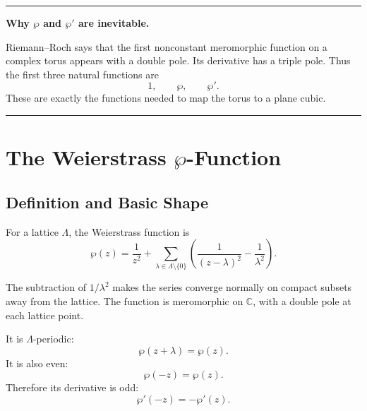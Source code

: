 \documentclass[11pt]{article}
\newcommand{\C}{\mathbb{C}}
\newenvironment{keyidea}[1]{%
  \par\medskip
  \begin{center}
  \begin{minipage}{0.92\textwidth}
  \hrule
  \smallskip
  \textbf{#1.}\quad\ignorespaces
}{%
  \smallskip
  \hrule
  \end{minipage}
  \end{center}
  \medskip
}
\begin{document}
\begin{keyidea}{Why \(\wp\) and \(\wp'\) are inevitable}
Riemann--Roch says that the first nonconstant meromorphic function on a
complex torus appears with a double pole.  Its derivative has a triple pole.
Thus the first three natural functions are
\[
1,\qquad \wp,\qquad \wp'.
\]
These are exactly the functions needed to map the torus to a plane cubic.
\end{keyidea}

\section{The Weierstrass \texorpdfstring{\(\wp\)}{wp}-Function}

\subsection{Definition and Basic Shape}

For a lattice \(\Lambda\), the Weierstrass function is
\[
\wp(z)
=
\frac{1}{z^2}
+
\sum_{\lambda\in\Lambda\setminus\{0\}}
\left(
\frac{1}{(z-\lambda)^2}
-
\frac{1}{\lambda^2}
\right).
\]

The subtraction of \(1/\lambda^2\) makes the series converge normally on
compact subsets away from the lattice.  The function is meromorphic on
\(\C\), with a double pole at each lattice point.

It is \(\Lambda\)-periodic:
\[
\wp(z+\lambda)=\wp(z).
\]
It is also even:
\[
\wp(-z)=\wp(z).
\]
Therefore its derivative is odd:
\[
\wp'(-z)=-\wp'(z).
\]
\end{document}
